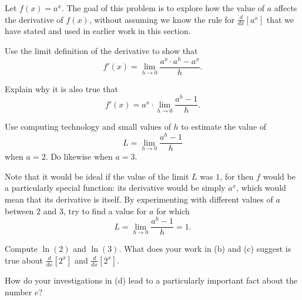 \begin{activity} \label{A:2.4.Act5}
Let $f(x) = a^x$.  The goal of this problem is to explore how the value of $a$ affects the derivative of $f(x)$, without assuming we know the rule for $\frac{d}{dx}[a^x]$ that we have stated and used in earlier work in this section.
\ba
	\item Use the limit definition of the derivative to show that
	$$f'(x) = \lim_{h \to 0} \frac{a^x \cdot a^h - a^x}{h}.$$
	\item Explain why it is also true that
	$$f'(x) = a^x \cdot \lim_{h \to 0} \frac{a^h - 1}{h}.$$
	\item Use computing technology and small values of $h$ to estimate the value of 
	$$L = \lim_{h \to 0} \frac{a^h - 1}{h}$$
	when $a = 2$.  Do likewise when $a = 3$.
	\item Note that it would be ideal if the value of the limit $L$ was $1$, for then $f$ would be a particularly special function:  its derivative would be simply $a^x$, which would mean that its derivative is itself.  By experimenting with different values of $a$ between $2$ and $3$, try to find a value for $a$ for which 
	$$L = \lim_{h \to 0} \frac{a^h - 1}{h} = 1.$$
	\item Compute $\ln(2)$ and $\ln(3)$.  What does your work in (b) and (c) suggest is true about $\frac{d}{dx}[2^x]$ and $\frac{d}{dx}[2^x]$.
	\item How do your investigations in (d) lead to a particularly important fact about the number $e$?
\ea

\end{activity} 